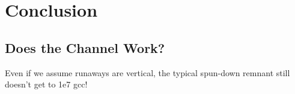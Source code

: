 \chapter{Conclusion}

\section{Does the \citeal{vkercj10} Channel Work?}

Even if we assume runaways are vertical, the typical spun-down remnant still doesn't get to 1e7 gcc!


